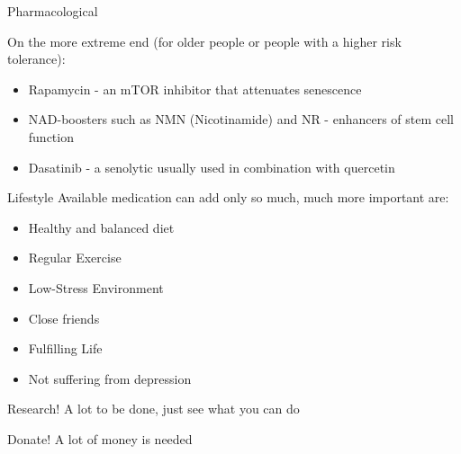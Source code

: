 \begin{frame}[c]{Pharmacological}
    \pause

    On the more extreme end (for older people or people with a higher risk tolerance):

    \begin{itemize}[<+(1)->]
        \item Rapamycin - an mTOR inhibitor that attenuates senescence
        \item NAD-boosters such as NMN (Nicotinamide) and NR - enhancers of stem cell function

        \item Dasatinib - a senolytic usually used in combination with quercetin
    \end{itemize}

\end{frame}


\begin{frame}[c]{Lifestyle}
    \large
    Available medication can add only so much, much more important are:

    \begin{itemize}[<+(1)->]
        \item Healthy and balanced diet
        \item Regular Exercise
        \item Low-Stress Environment
        \item Close friends
        \item Fulfilling Life
        \item Not suffering from depression
    \end{itemize}
\end{frame}


\begin{frame}[c]{Research!}
    A lot to be done, just see what you can do
\end{frame}


\begin{frame}[c]{Donate!}
    A lot of money is needed
\end{frame}
